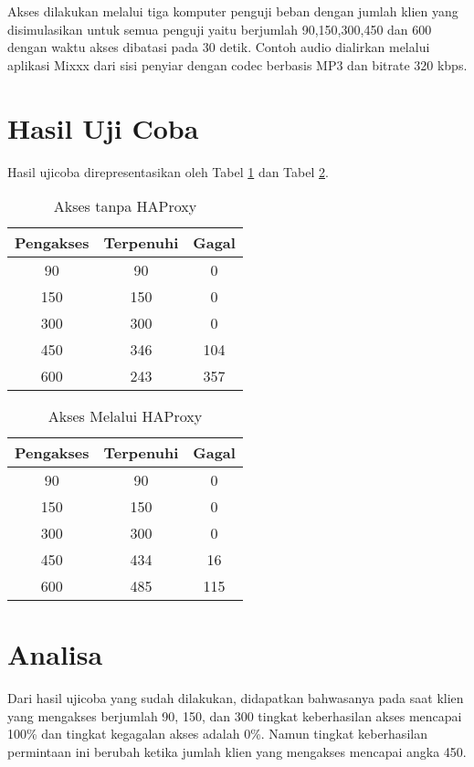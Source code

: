 Akses dilakukan melalui tiga komputer penguji beban dengan jumlah klien yang disimulasikan untuk semua penguji yaitu berjumlah 90,150,300,450 dan 600 dengan waktu akses dibatasi pada 30 detik. Contoh audio dialirkan melalui aplikasi Mixxx dari sisi penyiar dengan codec berbasis MP3 dan bitrate 320 kbps.


\section{Hasil Uji Coba}

Hasil ujicoba direpresentasikan oleh Tabel \ref{tab:nohaproxy} dan Tabel \ref{tab:haproxy}.
\begin{table}[h]
	\centering
	\caption{Akses tanpa HAProxy}
	\begin{tabular}{|c|c|c|}
		\hline
		\textbf{Pengakses} & \textbf{Terpenuhi} & \textbf{Gagal} \\ \hline
		90 & 90 & 0 \\ \hline
		150 & 150 & 0 \\ \hline
		300 & 300 & 0 \\ \hline
		450 & 346 & 104 \\ \hline
		600 & 243 & 357 \\ \hline
	\end{tabular}
	
	\label{tab:nohaproxy}
\end{table}


\begin{table}[h]
	\centering
	\caption{Akses Melalui HAProxy}
	\begin{tabular}{|c|c|c|}
		\hline
		\textbf{Pengakses} & \textbf{Terpenuhi} & \textbf{Gagal} \\ \hline
		90 & 90 & 0 \\ \hline
		150 & 150 & 0 \\ \hline
		300 & 300 & 0 \\ \hline
		450 & 434 & 16 \\ \hline
		600 & 485 & 115 \\ \hline
	\end{tabular}
	
	\label{tab:haproxy}
\end{table}


\section{Analisa}
	Dari hasil ujicoba yang sudah dilakukan, didapatkan bahwasanya pada saat klien yang mengakses berjumlah 90, 150, dan 300 tingkat keberhasilan akses mencapai 100\% dan tingkat kegagalan akses adalah 0\%. Namun tingkat keberhasilan permintaan ini berubah ketika jumlah klien yang mengakses mencapai angka 450.
	
